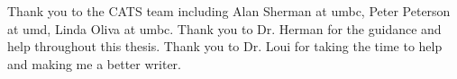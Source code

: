 Thank you to the CATS team including Alan Sherman at \gls{umbc}, Peter Peterson at \gls{umd}, Linda Oliva at \gls{umbc}. Thank you to Dr. Herman for the guidance and help throughout this thesis. Thank you to Dr. Loui for taking the time to help and making me a better writer.